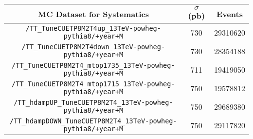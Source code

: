 
\begin{adjustbox}{max width=\textwidth}
\begin{tabular}{ccc} \hline\hline
    {\bf{MC Dataset for Systematics}} & {\bf{$\sigma$}} (pb) & {\bf{Events}}\\\hline\hline
 \verb|/TT_TuneCUETP8M2T4up_13TeV-powheg-pythia8/+year+M|            &  730 & 29310620 \\[0.1cm]
 \verb|/TT_TuneCUETP8M2T4down_13TeV-powheg-pythia8/+year+M|         &  730 & 28354188 \\[0.1cm]
 \verb|/TT_TuneCUETP8M2T4_mtop1735_13TeV-powheg-pythia8/+year+M|    &  711 & 19419050 \\[0.1cm]
 \verb|/TT_TuneCUETP8M2T4_mtop1715_13TeV-powheg-pythia8/+year+M|    &  750 & 19578812 \\[0.1cm]
 \verb|/TT_hdampUP_TuneCUETP8M2T4_13TeV-powheg-pythia8/+year+M|     &  750 & 29689380 \\[0.1cm]
 \verb|/TT_hdampDOWN_TuneCUETP8M2T4_13TeV-powheg-pythia8/+year+M|   &  750 & 29117820
    \\[0.1cm]\hline
\end{tabular}
\end{adjustbox}
